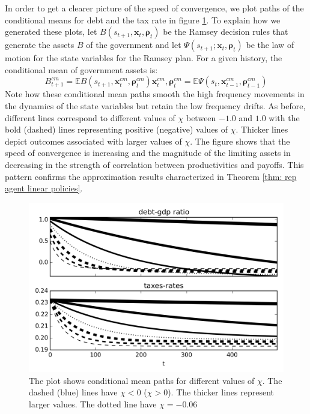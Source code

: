 \documentclass[thmsb,11pt]{article}
\begin{document}
In order to get a clearer picture of the speed of convergence, we plot  paths of the conditional means for debt and the  tax rate in figure \ref{fig:speed_of_convergence}.
To explain how we generated these plots, let $B(s_{t+1},\bm x_t, \bm \rho_t)$ be the Ramsey decision rules
that generate the assets $B$ of the government and let $\Psi \left( s_{t+1};\bm{x}_t,\bm{\rho }_t\right)$ be the law of motion for the state variables for the Ramsey plan.
For a given history, the conditional mean of government assets is:
\begin{subequations}
\begin{equation}
B^{cm}_{t+1}=\mathbb{E}B(s_{t+1},\bm x^{cm}_t,\bm \rho^{cm}_{t})
\end{equation}
 \begin{equation}
 \bm x^{cm}_t,\bm \rho^{cm}_{t}=\mathbb{E}\Psi (s_{t}, \bm x^{cm}_{t-1},\bm \rho^{cm}_{t-1})
 \end{equation}
\end{subequations}
Note how these conditional mean  paths smooth the high frequency movements in the dynamics of the state variables but retain the low frequency drifts.
 As before,  different lines correspond to  different values of $\chi$ between $-1.0$ and $1.0$ with the bold (dashed) lines representing positive (negative) values of $\chi$.
 Thicker  lines depict outcomes associated with larger values of $\chi$. The figure  shows that the speed of convergence is increasing and the magnitude of the limiting assets in decreasing
 in the strength of correlation between productivities and payoffs. This pattern  confirms the approximation results characterized in Theorem \ref{thm: rep agent linear policies}.

 {
  \begin{figure}
  \label{fig:speed_of_convergence}
    \centering
    \includegraphics[width = .9\textwidth]{cesplots/speed_of_convergence.png}
    \caption{The plot shows conditional mean paths for different values of $\chi$. The dashed (blue) lines have $\chi<0$ ($\chi>0$). The thicker lines represent larger values. The dotted line have $\chi=-0.06$}
  \end{figure}

}
\end{document}
